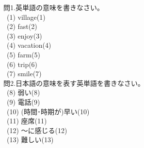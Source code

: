 \documentclass[uplatex]{jsarticle}
\title{\vspace{-30mm}\flushleft{\huge{第3回\ (\ \ 月\ \ 日)\ Unit5〜7}}}
\author{\Large{\hspace{90mm}名前\hspace{40mm}得点\hspace{20mm}点}}
\date{\empty}
\begin{document}
\maketitle
\vspace{-10mm}
\Large 問1.英単語の意味を書きなさい。\\
\large\ (1) village\hspace{10mm}\hspace{\fill}(1)\underline{\hspace{35mm}}\\
\ (2) fast\hspace{\fill}(2)\underline{\hspace{35mm}}\\
\ (3) enjoy\hspace{\fill}(3)\underline{\hspace{35mm}}\\
\ (4) vacation\hspace{\fill}(4)\underline{\hspace{35mm}}\\
\ (5) farm\hspace{\fill}(5)\underline{\hspace{35mm}}\\
\ (6) trip\hspace{\fill}(6)\underline{\hspace{35mm}}\\
\ (7) smile\hspace{\fill}(7)\underline{\hspace{35mm}}\\
\Large 問2.日本語の意味を表す英単語を書きなさい。\\
\large\ (8) 弱い\hspace{\fill}(8)\underline{\hspace{35mm}}\\
\ (9) 電話\hspace{\fill}(9)\underline{\hspace{35mm}}\\
\ (10) (時間･時期が)早い\hspace{\fill}(10)\underline{\hspace{35mm}}\\
\ (11) 座席\hspace{\fill}(11)\underline{\hspace{35mm}}\\
\ (12) 〜に感じる\hspace{\fill}(12)\underline{\hspace{35mm}}\\
\ (13) 難しい\hspace{\fill}(13)\underline{\hspace{35mm}}\\
\end{document}
